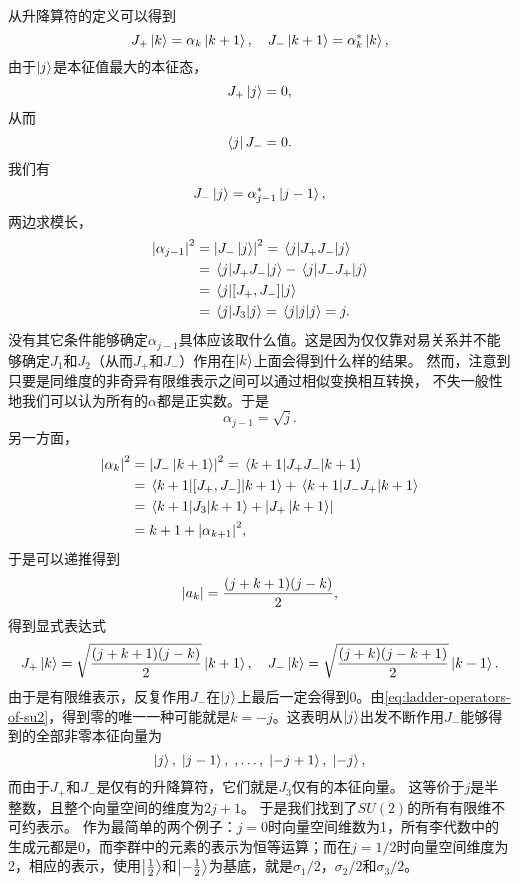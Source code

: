 \documentclass[hyperref, UTF8, a4paper]{ctexart}
\begin{document}
从升降算符的定义可以得到
\[
    J_+ \ket{k} = \alpha_k \ket{k+1}, \quad J_- \ket{k+1} = \alpha_k^* \ket{k},
\]
由于$\ket{j}$是本征值最大的本征态，
\[
    J_+ \ket{j} = 0,
\]
从而
\[
    \bra{j} J_- = 0.
\]
我们有
\[
    J_- \ket{j} = \alpha_{j-1}^* \ket{j-1},
\]
两边求模长，
\[
    \begin{aligned}
        \abs{\alpha_{j-1}}^2 &= \abs{J_- \ket{j}}^2 = \mel{j}{J_+ J_-}{j} \\
        &= \mel{j}{J_+ J_-}{j} - \mel{j}{J_- J_+}{j} \\
        &= \mel{j}{[J_+, J_-]}{j} \\
        &= \mel{j}{J_3}{j} = \mel{j}{j}{j} = j.
    \end{aligned}
\]
没有其它条件能够确定$\alpha_{j-1}$具体应该取什么值。这是因为仅仅靠对易关系并不能够确定$J_1$和$J_2$（从而$J_+$和$J_-$）作用在$\ket{k}$上面会得到什么样的结果。
然而，注意到只要是同维度的非奇异有限维表示之间可以通过相似变换相互转换，%
不失一般性地我们可以认为所有的$\alpha$都是正实数。于是
\[
    \alpha_{j-1} = \sqrt{j}.
\]
另一方面，
\[
    \begin{aligned}
        \abs{\alpha_k}^2 &= \abs{J_- \ket{k+1}}^2 = \mel{k+1}{J_+ J_-}{k+1} \\
        &= \mel{k+1}{[J_+, J_-]}{k+1} + \mel{k+1}{J_- J_+}{k+1} \\
        &= \mel{k+1}{J_3}{k+1} + \abs{J_+ \ket{k+1}} \\
        &= k+1 + \abs{\alpha_{k+1}}^2,
    \end{aligned} 
\]
于是可以递推得到
\[
    \abs{a_k} = \frac{(j+k+1)(j-k)}{2},
\]
得到显式表达式
\begin{equation}
    J_+ \ket{k} = \sqrt{\frac{(j+k+1)(j-k)}{2}} \ket{k+1}, \quad J_- \ket{k} = \sqrt{\frac{(j+k)(j-k+1)}{2}} \ket{k-1}.
    \label{eq:ladder-operators-of-su2}
\end{equation}
由于是有限维表示，反复作用$J_-$在$\ket{j}$上最后一定会得到$0$。由\eqref{eq:ladder-operators-of-su2}，得到零的唯一一种可能就是$k=-j$。这表明从$\ket{j}$出发不断作用$J_-$能够得到的全部非零本征向量为
\[
    \ket{j}, \; \ket{j-1}, \; , \ldots, \; \ket{-j+1}, \; \ket{-j},
\]
而由于$J_+$和$J_-$是仅有的升降算符，它们就是$J_3$仅有的本征向量。
这等价于$j$是半整数，且整个向量空间的维度为$2j+1$。
于是我们找到了$SU(2)$的所有有限维不可约表示。
作为最简单的两个例子：$j=0$时向量空间维数为1，所有李代数中的生成元都是0，而李群中的元素的表示为恒等运算；而在$j=1/2$时向量空间维度为2，相应的表示，使用$\ket{\frac{1}{2}}$和$\ket{-\frac{1}{2}}$为基底，就是$\sigma_1 / 2$，$\sigma_2 / 2$和$\sigma_3 / 2$。
\end{document}
